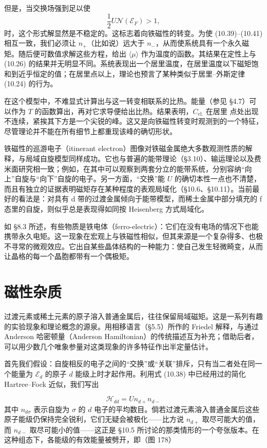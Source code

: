 但是，当交换场强到足以使
\begin{equation*}
\frac{1}{2}U\mathcal{N}(\mathcal{E}_{F})>1,
\tag{10.43}
\end{equation*}
时，这个形式解显然是不稳定的。这标志着向铁磁性的转变。为使 (10.39)–(10.41) 相互一致，我们必须让 $n_{+}$（比如说）远大于 $n_{-}$，从而使系统具有一个永久磁矩。随后便可数值求解这些方程，给出 $\langle\mu\rangle$ 作为温度的函数。其结果在定性上与 (10.26) 的结果并无明显不同。系统表现出一个居里温度，在居里温度以下磁矩饱和到近乎恒定的值；在居里点以上，理论也预言了某种类似于居里–外斯定律 (10.24) 的行为。

在这个模型中，不难显式计算出与这一转变相联系的比热。能量（参见 §4.7）可以作为 $T$ 的函数算出，再对它求导便给出比热。结果表明，$C_{\mathrm{el.}}$ 在居里
点处出现不连续，紧挨其下方是一个尖锐的峰。这又是向铁磁性转变时观测到的一个特征，尽管理论并不能在所有细节上都重现该峰的确切形状。

铁磁性的巡游电子（itinerant electron）图像对铁磁金属绝大多数观测性质的解释，与局域自旋模型同样成功。它也与普遍的能带理论（§3.10）、输运理论以及费米面研究相一致；例如，在其中可以观察到两套分立的能带系统，分别容纳“向上”自旋与“向下”自旋的电子。另一方面，“交换”能 $U$ 的确切本性一点也不清楚，而且有独立的证据表明磁矩存在某种程度的表观局域化（§10.6、§10.11）。当前最好的看法是：对具有 d 带的过渡金属倾向于能带模型，而稀土金属中部分填充的 f 态里的自旋，则似乎总是表现得如同按 Heisenberg 方式局域化。

如 §8.3 所述，有些物质是铁电体（ferro-electric）：它们在没有电场的情况下也能携带永久电矩。这一现象在宏观上与铁磁性相似，但其来源是一个复杂得多、也极不寻常的微观效应。它出自某些晶体结构的一种能力：使自己发生轻微畸变，从而让晶格的每一个晶胞都带有一个偶极矩。

\section{磁性杂质}

过渡元素或稀土元素的原子溶入普通金属后，往往保留局域磁矩。这是一系列有趣的实验现象和理论概念的源泉。用相移语言（§5.5）所作的 Friedel 解释，与通过 Anderson 哈密顿量（Anderson Hamiltonian）的传统描述互为补充；借助后者，可以用少数几个唯象参量对这类现象的许多特征作出半定量估计。

首先我们假设：自旋相反的电子之间的“交换”或“关联”排斥，只有当二者处在同一个能量为 $\mathcal{E}_d$ 的原子 $d$ 能级上时才起作用。利用式 (10.38) 中已经用过的简化 Hartree--Fock 近似，我们写出

\begin{equation*}
\mathcal{H}_{dd} = U n_{d+} n_{d-} \tag{10.44}
\end{equation*}
其中 $n_{d\sigma}$ 表示自旋为 $\sigma$ 的 $d$ 电子的平均数目。倘若过渡元素溶入普通金属后这些原子能级仍保持完全锐利，它们无疑会被极化——比方说 $n_{d+}$ 取尽可能大的值，而 $n_{d-}$ 取尽可能小的值——这正是 §10.5 所讨论的那类情形的一个夸张版本。在这种组态下，各能级的有效能量被劈开，即（图 178）

